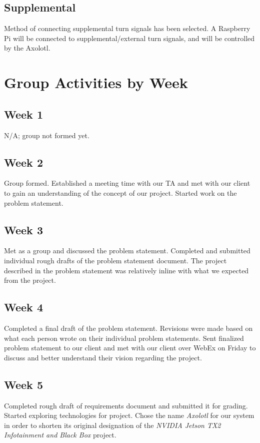 \documentclass[onecolumn, draftclsnofoot,10pt, compsoc]{IEEEtran}
\begin{document}
\subsection{Supplemental}
Method of connecting supplemental turn signals has been selected. A Raspberry Pi will be connected to supplemental/external turn signals, and will be controlled by the Axolotl.

\section{Group Activities by Week}

\subsection{Week 1}
N/A; group not formed yet.

\subsection{Week 2}
Group formed. Established a meeting time with our TA and met with our client to gain an understanding of the concept of our project. Started work on the problem statement.

\subsection{Week 3}
Met as a group and discussed the problem statement. Completed and submitted individual rough drafts of the problem statement document. The project described in the problem statement was relatively inline with what we expected from the project.

\subsection{Week 4}
Completed a final draft of the problem statement. Revisions were made based on what each person wrote on their individual problem statements. Sent finalized problem statement to our client and met with our client over WebEx on Friday to discuss and better understand their vision regarding the project.

\subsection{Week 5}
Completed rough draft of requirements document and submitted it for grading. Started exploring technologies for project. Chose the name \textit{Axolotl} for our system in order to shorten its original designation of the \textit{NVIDIA Jetson TX2 Infotainment and Black Box} project.
\end{document}
